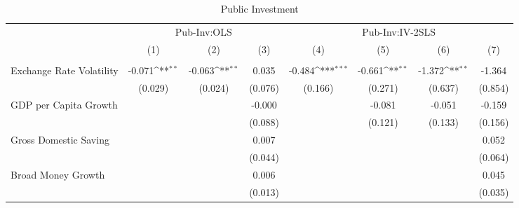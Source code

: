 \begin{table}[H] \def\sym#1{\ifmmode^{#1}\else\(^{#1}\)\fi} \caption{Public Investment} \begin{adjustbox}{max width=\textwidth} \begin{tabular}{l*{7}{c}} \\ \hline\hline
            &\multicolumn{3}{c}{Pub-Inv:OLS}                                  &\multicolumn{4}{c}{Pub-Inv:IV-2SLS}                                                    \\\cmidrule(lr){2-4}\cmidrule(lr){5-8}
            &\multicolumn{1}{c}{(1)}         &\multicolumn{1}{c}{(2)}         &\multicolumn{1}{c}{(3)}         &\multicolumn{1}{c}{(4)}         &\multicolumn{1}{c}{(5)}         &\multicolumn{1}{c}{(6)}         &\multicolumn{1}{c}{(7)}         \\
\hline \addlinespace \multicolumn{7}{l}{} \\  \addlinespace[2pt]
Exchange Rate Volatility&      -0.071\sym{**} &      -0.063\sym{**} &       0.035         &      -0.484\sym{***}&      -0.661\sym{**} &      -1.372\sym{**} &      -1.364         \\
            &     (0.029)         &     (0.024)         &     (0.076)         &     (0.166)         &     (0.271)         &     (0.637)         &     (0.854)         \\
\addlinespace
GDP per Capita Growth&                     &                     &      -0.000         &                     &      -0.081         &      -0.051         &      -0.159         \\
            &                     &                     &     (0.088)         &                     &     (0.121)         &     (0.133)         &     (0.156)         \\
\addlinespace
Gross Domestic Saving&                     &                     &       0.007         &                     &                     &                     &       0.052         \\
            &                     &                     &     (0.044)         &                     &                     &                     &     (0.064)         \\
\addlinespace
Broad Money Growth&                     &                     &       0.006         &                     &                     &                     &       0.045         \\
            &                     &                     &     (0.013)         &                     &                     &                     &     (0.035)         \\

\end{tabular}
\end{adjustbox}
\end{table}
